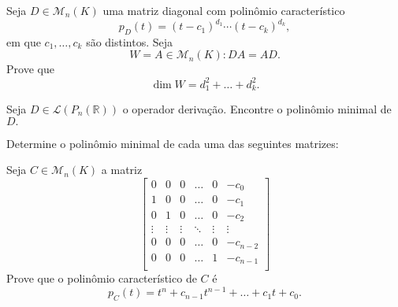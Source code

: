 \documentclass[11pt,a4paper]{article}
\begin{document}
     Seja $D \in \mathcal{M}_n(K)$ uma matriz diagonal com polinômio característico
\[p_D(t) = (t - c_1)^{d_1} \cdots (t - c_k)^{d_k},
\]
em que $c_1, \ldots , c_k$ são distintos. Seja
\[W = {A \in \mathcal{M}_n(K) : DA = AD}.\]
Prove que 
\[\dim W = d_1^2 + \ldots + d_k^2.\]

    \solucao{}
   
     Seja $D \in \mathcal{L}(P_n(\mathbb{R}))$ o operador derivação. Encontre o polinômio minimal de $D.$ 
    
    \solucao{}
   
     Determine o polinômio minimal de cada uma das seguintes matrizes: 
     
      \solucao{}
   
     Seja $C \in \mathcal{M}_n(K)$ a matriz
    \[             \begin{bmatrix}
        0& 0 & 0 & \ldots & 0 & -c_0 \\ 
        1& 0 & 0 & \ldots & 0 & -c_1 \\ 
        0& 1 & 0 & \ldots & 0 & -c_2 \\ 
        \vdots& \vdots & \vdots & \ddots & \vdots & \vdots \\ 
        0& 0 & 0 & \ldots & 0 & -c_{n-2} \\ 
        0& 0 & 0 & \ldots & 1 & -c_{n-1} \\ 
        \end{bmatrix}
    \]
    Prove que o polinômio característico de $C$ é 
    \[
    p_C(t) = t^n + c_{n-1}t^{n-1} + \ldots + c_1t + c_0. \]
    
\end{document}
